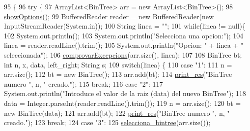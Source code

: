 \begin{DoxyCode}
95                                            \{
96         \textcolor{keywordflow}{try} \{
97             ArrayList<BinTree> arr = \textcolor{keyword}{new} ArrayList<BinTree>();
98             \hyperlink{classdomini_1_1utils_1_1Driver____BinTree_aadd7535430d353033b6f35b6d466e018}{showOptions}();
99             BufferedReader reader = \textcolor{keyword}{new} BufferedReader(\textcolor{keyword}{new} InputStreamReader(System.in));
100             String linea = \textcolor{stringliteral}{""};
101             \textcolor{keywordflow}{while}(linea != null)\{
102                 System.out.println();
103                 System.out.println(\textcolor{stringliteral}{"Selecciona una opcion:"});
104                 linea = reader.readLine().trim();
105                 System.out.println(\textcolor{stringliteral}{"Opcion: "} + linea + \textcolor{stringliteral}{" seleccionada"});
106                 \hyperlink{classdomini_1_1utils_1_1Driver____BinTree_a06b6edeb965f3677c7ebb085d512f568}{comprovarExcepcions}(arr.size(), linea);
107 
108                 BinTree bt; \textcolor{keywordtype}{int} n, x, data, left\_right; String s;
109                 \textcolor{keywordflow}{switch}(linea) \{
110                     \textcolor{keywordflow}{case} \textcolor{stringliteral}{"1"}:
111                         n = arr.size();
112                         bt = \textcolor{keyword}{new} BinTree();
113                         arr.add(bt);
114                         \hyperlink{classdomini_1_1utils_1_1Driver____BinTree_a434e26afb3eb701558d81b0fd1c29dcb}{print\_res}(\textcolor{stringliteral}{"BinTree numero "}, n, \textcolor{stringliteral}{" creado."});
115                     \textcolor{keywordflow}{break};
116                     \textcolor{keywordflow}{case} \textcolor{stringliteral}{"2"}:
117                         System.out.println(\textcolor{stringliteral}{"Introduce el valor de la raiz (data) del nuevo BinTree"});
118                         data = Integer.parseInt(reader.readLine().trim());
119                         n = arr.size();
120                         bt = \textcolor{keyword}{new} BinTree(data);
121                         arr.add(bt);
122                         \hyperlink{classdomini_1_1utils_1_1Driver____BinTree_a434e26afb3eb701558d81b0fd1c29dcb}{print\_res}(\textcolor{stringliteral}{"BinTree numero "}, n, \textcolor{stringliteral}{" creado."});
123                     \textcolor{keywordflow}{break};
124                     \textcolor{keywordflow}{case} \textcolor{stringliteral}{"3"}:
125                         \hyperlink{classdomini_1_1utils_1_1Driver____BinTree_a0d90bf2cb928174547e712140b5a4fe5}{selecciona\_bintree}(arr.size());

\end{DoxyCode}
